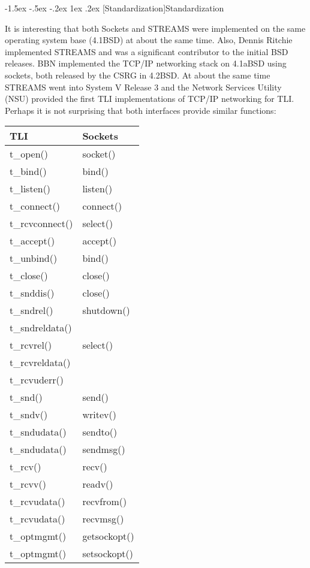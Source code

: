 \documentclass[letterpaper,final,notitlepage,twocolumn,10pt,twoside]{article}
\makeatletter
\renewcommand\subsection{\@startsection{subsection}{2}{\z@}%
                                     {-1.5ex \@plus -.5ex \@minus -.2ex}%
                                     {1ex \@plus .2ex}%
                                     {\normalfont\normalsize\bfseries}}
\makeatother
\begin{document}
\subsection[Standardization]{Standardization}

It is interesting that both Sockets and STREAMS were implemented on the same
operating system base (4.1BSD) at about the same time.  Also, Dennis Ritchie
implemented STREAMS and was a significant contributor to the initial BSD
releases.  BBN implemented the TCP/IP networking stack on 4.1aBSD using
sockets, both released by the CSRG in 4.2BSD.  At about the same time STREAMS
went into System V Release 3 and the Network Services Utility (NSU) provided
the first TLI implementations of TCP/IP networking for TLI.  Perhaps it is not
surprising that both interfaces provide similar functions:

\begin{center}
\begin{tabular}{ll}
TLI & Sockets\\
\hline
t\_open() & socket()\\
t\_bind() & bind()\\
t\_listen() & listen()\\
t\_connect() & connect()\\
t\_rcvconnect() & select()\\
t\_accept() & accept()\\
t\_unbind() & bind()\\
t\_close() & close()\\
t\_snddis() & close()\\
t\_sndrel() & shutdown()\\
t\_sndreldata() & \\
t\_rcvrel() & select()\\
t\_rcvreldata() & \\
t\_rcvuderr() & \\
t\_snd() & send()\\
t\_sndv() & writev()\\
t\_sndudata() & sendto()\\
t\_sndudata() & sendmsg()\\
t\_rcv() & recv()\\
t\_rcvv() & readv()\\
t\_rcvudata() & recvfrom()\\
t\_rcvudata() & recvmsg()\\
t\_optmgmt() & getsockopt()\\
t\_optmgmt() & setsockopt()\\
\hline
\end{tabular}
\end{center}
\end{document}
